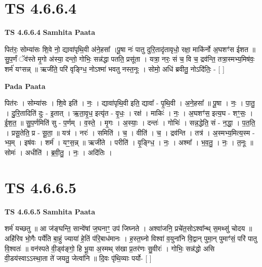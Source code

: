 \documentclass[17pt]{extarticle}
\begin{document}
\section*{ TS 4.6.6.4 }

\textbf{TS 4.6.6.4 } \newline
\textbf{Samhita Paata} \newline

पित॑रः॒ सोम्या॑सः शि॒वे नो॒ द्यावा॑पृथि॒वी अ॑ने॒हसा᳚ ।पू॒षा नः॑ पातु दुरि॒तादृ॑तावृधो॒ रक्षा॒ माकि॑र्नो अ॒घशꣳ॑स ईशत ॥ सु॒प॒र्णं ॅव॑स्ते मृ॒गो अ॑स्या॒ दन्तो॒ गोभिः॒ सन्न॑द्धा पतति॒ प्रसू॑ता । यत्रा॒ नरः॒ सं च॒ वि च॒ द्रव॑न्ति॒ तत्रा॒स्मभ्य॒मिष॑वः॒ शर्म॑ यꣳसन्न् ॥ ऋजी॑ते॒ परि॑ वृङ्ग्धि॒ नोऽश्मा॑ भवतु नस्त॒नूः । सोमो॒ अधि॑ ब्रवीतु॒ नोऽदि॑तिः॒ - [  ] \newline

\textbf{Pada Paata} \newline

पित॑रः । सोम्या॑सः । शि॒वे इति॑ । नः॒ । द्यावा॑पृथि॒वी इति॒ द्यावा᳚ - पृ॒थि॒वी । अ॒ने॒हसा᳚ ॥ पू॒षा । नः॒ । पा॒तु॒ । दु॒रि॒तादिति॑ दुः - इ॒तात् । ऋ॒ता॒वृ॒ध॒ इत्यृ॑त - वृ॒धः॒ । रक्ष॑ । माकिः॑ । नः॒ । अ॒घशꣳ॑स॒ इत्य॒घ - शꣳ॒॒सः॒ । ई॒श॒त॒ ॥ सु॒प॒र्णमिति॑ सु - प॒र्णम् । व॒स्ते॒ । मृ॒गः । अ॒स्याः॒ । दन्तः॑ । गोभिः॑ । सन्न॒द्धेति॒ सं - न॒द्धा॒ । प॒त॒ति॒ । प्रसू॒तेति॒ प्र - सू॒ता॒ ॥ यत्र॑ । नरः॑ । समिति॑ । च॒ । वीति॑ । च॒ । द्रव॑न्ति । तत्र॑ । अ॒स्मभ्य॒मित्य॒स्म - भ्य॒म् । इष॑वः । शर्म॑ । यꣳ॒॒स॒न्न् ॥ ऋजी॑ते । परीति॑ । वृ॒ङ्ग्धि॒ । नः॒ । अश्मा᳚ । भ॒व॒तु॒ । नः॒ । त॒नूः ॥ सोमः॑ । अधीति॑ । ब्र॒वी॒तु॒ । नः॒ । अदि॑तिः ।  \newline




\section*{ TS 4.6.6.5 }

\textbf{TS 4.6.6.5 } \newline
\textbf{Samhita Paata} \newline

शर्म॑ यच्छतु ॥ आ ज॑ङ्घन्ति॒ सान्वे॑षां ज॒घनाꣳ॒॒ उप॑ जिघ्नते । अश्वा॑जनि॒ प्रचे॑त॒सोऽश्वा᳚न्थ् स॒मथ्सु॑ चोदय ॥ अहि॑रिव भो॒गैः पर्ये॑ति बा॒हुं ज्याया॑ हे॒तिं प॑रि॒बाध॑मानः । ह॒स्त॒घ्नो विश्वा॑ व॒युना॑नि वि॒द्वान् पुमा॒न् पुमाꣳ॑सं॒ परि॑ पातु वि॒श्वतः॑ ॥ वन॑स्पते वी॒ड्व॑ङ्गो॒ हि भू॒या अ॒स्मथ् स॑खा प्र॒तर॑णः सु॒वीरः॑ । गोभिः॒ सन्न॑द्धो असि वी॒डय॑स्वाऽऽस्था॒ता ते॑ जयतु॒ जेत्वा॑नि ॥ दि॒वः पृ॑थि॒व्याः पर्यो- [  ] \newline
\end{document}

